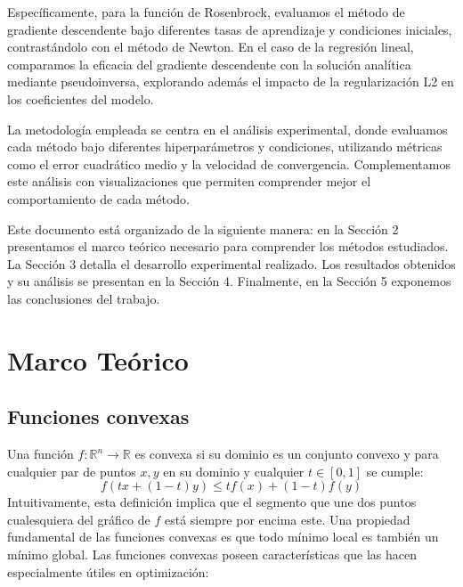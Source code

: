\documentclass{tp02}
\begin{document}
Específicamente, para la función de Rosenbrock, evaluamos el método de
gradiente descendente bajo diferentes tasas de aprendizaje y condiciones
iniciales, contrastándolo con el método de Newton. En el caso de la
regresión lineal, comparamos la eficacia del gradiente descendente con la
solución analítica mediante pseudoinversa, explorando además el impacto de
la regularización L2 en los coeficientes del modelo.

La metodología empleada se centra en el análisis experimental, donde
evaluamos cada método bajo diferentes hiperparámetros y condiciones,
utilizando métricas como el error cuadrático medio y la velocidad de
convergencia. Complementamos este análisis con visualizaciones que permiten
comprender mejor el comportamiento de cada método.

Este documento está organizado de la siguiente manera: en la Sección 2
presentamos el marco teórico necesario para comprender los métodos
estudiados. La Sección 3 detalla el desarrollo experimental realizado. Los
resultados obtenidos y su análisis se presentan en la Sección 4.
Finalmente, en la Sección 5 exponemos las conclusiones del trabajo.


\section{Marco Teórico}

\subsection{Funciones convexas}
Una función $f:\mathbb{R}^n \to \mathbb{R}$ es convexa si su dominio es un conjunto
convexo y para cualquier par de puntos $x,y$ en su dominio y cualquier $t \in [0,1]$ se
cumple:
\begin{equation}
f(tx + (1-t)y) \leq tf(x) + (1-t)f(y)
\end{equation}
Intuitivamente, esta definición implica que el segmento que une dos puntos cualesquiera
del gráfico de $f$ está siempre por encima este. Una propiedad fundamental
de las funciones convexas es que todo mínimo local es también un mínimo global.
Las funciones convexas poseen características que las hacen especialmente útiles en
optimización:
\end{document}
